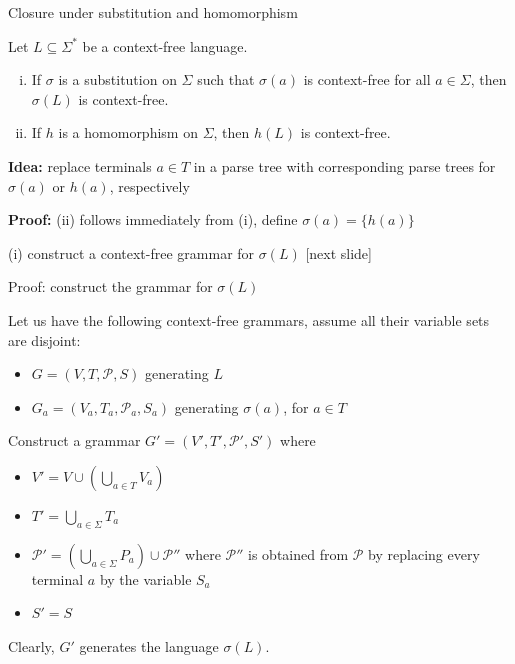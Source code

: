 \documentclass[handout]{beamer}
\begin{document}
\begin{frame}{Closure under substitution and homomorphism}
   
    \begin{theorem}
        Let $L\subseteq\Sigma^*$ be a context-free language.
        \begin{enumerate}[(i)]
            \item If $\sigma$ is a substitution on $\Sigma$ such that $\sigma(a)$ is context-free for all $a\in \Sigma$, then $\sigma(L)$ is context-free.
            \item If $h$ is a homomorphism on $\Sigma$, then $h(L)$ is context-free.
        \end{enumerate}   
    \end{theorem}

    \textbf{Idea:} replace terminals $a\in T$ in a parse tree with corresponding  parse trees for $\sigma(a)$ or $h(a)$, respectively

    \vspace{-12pt}
    \begin{multicols}{2}

        \phantom{.}

        \textbf{Proof:} \alert{(ii)} follows immediately from (i), define $\sigma(a)=\{h(a)\}$

        \alert{(i)} construct a context-free grammar for $\sigma(L)$ [next slide]

        
        \begin{center}
            \scalebox{1}{
                        
            }
        \end{center}

    \end{multicols}
    
\end{frame}


\begin{frame}{Proof: construct the grammar for $\sigma(L)$}

    Let us have the following context-free grammars, assume all their variable sets are disjoint:
    \begin{itemize}
        \item $G=(V,T,\mathcal P,S)$ generating $L$
        \item $G_a=(V_a,T_a,\mathcal P_a,S_a)$ generating $\sigma(a)$, for $a\in T$
    \end{itemize} 

    Construct a grammar $G'=(V',T',\mathcal P',S')$ where
    \begin{itemize}
        \item $V'=V\cup (\bigcup_{a\in T} V_a)$
	    \item $T'=\bigcup_{a\in \Sigma} T_a$
	    \item $\mathcal P'=(\bigcup_{a\in \Sigma} P_a) \cup \mathcal P''$ where $\mathcal P''$ is obtained from $\mathcal P$ by replacing every terminal $a$ by the variable $S_a$
	    \item $S'=S$
    \end{itemize}
    Clearly, $G'$ generates the language $\sigma(L)$.
    \hfill\qedsymbol

\end{frame}
\end{document}
